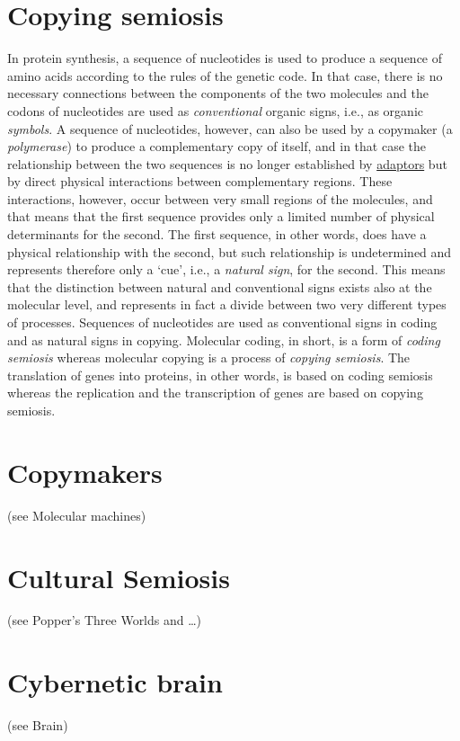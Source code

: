 \documentclass[12pt]{article}
\begin{document}
\section{Copying semiosis}
In protein synthesis, a sequence of nucleotides is used to produce a sequence of amino acids according to the rules of the genetic code. In that case, there is no necessary connections between the components of the two molecules and the codons of nucleotides are used as \textit{conventional} organic signs, i.e., as organic\textit{ symbols}. A sequence of nucleotides, however, can also be used by a copymaker (a \textit{polymerase}) to produce a complementary copy of itself, and in that case the relationship between the two sequences is no longer established by \hyperlink{adaptor}{adaptors} but by direct physical interactions between complementary regions. These interactions, however, occur between very small regions of the molecules, and that means that the first sequence provides only a limited number of physical determinants for the second. The first sequence, in other words, does have a physical relationship with the second, but such relationship is undetermined and represents therefore only a `cue', i.e., a \textit{natural sign}, for the second. This means that the distinction between natural and conventional signs exists also at the molecular level, and represents in fact a divide between two very different types of processes. Sequences of nucleotides are used as conventional signs in coding and as natural signs in copying. Molecular coding, in short, is a form of \textit{coding semiosis} whereas molecular copying is a process of \textit{copying semiosis}. The translation of genes into proteins, in other words, is based on coding semiosis whereas the replication and the transcription of genes are based on copying semiosis.


\section{Copymakers} (see Molecular machines) 
 

\section{Cultural Semiosis} (see Popper's Three Worlds and …)


\section{Cybernetic brain} (see Brain)
\end{document}
